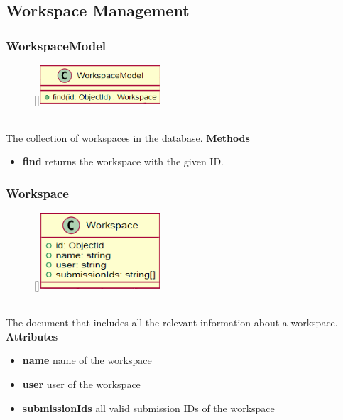 \newpage
\subsection{Workspace Management}

\subsubsection{WorkspaceModel}
\label{WorkspaceModel}
\begin{figure}
    \raisebox{0pt}[\dimexpr{}\baselineskip\relax]{\includegraphics[width=4.5cm]{classes/workspace-management/1.png}}
\end{figure} 
~\\
The collection of workspaces in the database.
\newline
\newline
\newline
\newline
\textbf{Methods}
\begin{itemize}
    \item \textbf{find} returns the workspace with the given ID.
\end{itemize}

\subsubsection{Workspace}
\label{wm-Workspace}
\begin{figure}
    \raisebox{0pt}[\dimexpr{}\baselineskip\relax]{\includegraphics[width=4.5cm]{classes/workspace-management/2.png}}
\end{figure} 
~\\
The document that includes all the relevant information about a workspace.
\newline
\newline
\newline
\newline
\newline
\newline
\textbf{Attributes}
\begin{itemize}
    \item \textbf{name} name of the workspace
    \item \textbf{user} user of the workspace
    \item \textbf{submissionIds} all valid submission IDs of the workspace
\end{itemize}

